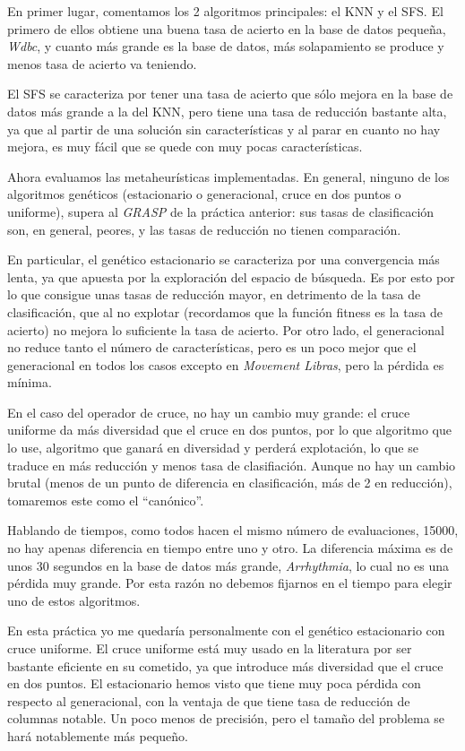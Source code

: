 \documentclass[a4paper, 11pt]{article}
\begin{document}
    En primer lugar, comentamos los 2 algoritmos principales: el KNN y el SFS. El primero de ellos obtiene una buena tasa de acierto en la base de datos pequeña, \emph{Wdbc}, y cuanto más grande es la base de datos, más solapamiento se produce y menos tasa de acierto va teniendo.

    El SFS se caracteriza por tener una tasa de acierto que sólo mejora en la base de datos más grande a la del KNN, pero tiene una tasa de reducción bastante alta, ya que al partir de una solución sin características y al parar en cuanto no hay mejora, es muy fácil que se quede con muy pocas características.

    Ahora evaluamos las metaheurísticas implementadas. En general, ninguno de los algoritmos genéticos (estacionario o generacional, cruce en dos puntos o uniforme), supera al \emph{GRASP} de la práctica anterior: sus tasas de clasificación son, en general, peores, y las tasas de reducción no tienen comparación.

    En particular, el genético estacionario se caracteriza por una convergencia más lenta, ya que apuesta por la exploración del espacio de búsqueda. Es por esto por lo que consigue unas tasas de reducción mayor, en detrimento de la tasa de clasificación, que al no explotar (recordamos que la función fitness es la tasa de acierto) no mejora lo suficiente la tasa de acierto. Por otro lado, el generacional no reduce tanto el número de características, pero es un poco mejor que el generacional en todos los casos excepto en \emph{Movement Libras}, pero la pérdida es mínima.

    En el caso del operador de cruce, no hay un cambio muy grande: el cruce uniforme da más diversidad que el cruce en dos puntos, por lo que algoritmo que lo use, algoritmo que ganará en diversidad y perderá explotación, lo que se traduce en más reducción y menos tasa de clasifiación. Aunque no hay un cambio brutal (menos de un punto de diferencia en clasificación, más de 2 en reducción), tomaremos este como el ``canónico''.

    Hablando de tiempos, como todos hacen el mismo número de evaluaciones, 15000, no hay apenas diferencia en tiempo entre uno y otro. La diferencia máxima es de unos 30 segundos en la base de datos más grande, \emph{Arrhythmia}, lo cual no es una pérdida muy grande. Por esta razón no debemos fijarnos en el tiempo para elegir uno de estos algoritmos.

    En esta práctica yo me quedaría personalmente con el genético estacionario con cruce uniforme. El cruce uniforme está muy usado en la literatura por ser bastante eficiente en su cometido, ya que introduce más diversidad que el cruce en dos puntos. El estacionario hemos visto que tiene muy poca pérdida con respecto al generacional, con la ventaja de que tiene tasa de reducción de columnas notable. Un poco menos de precisión, pero el tamaño del problema se hará notablemente más pequeño.
\end{document}

